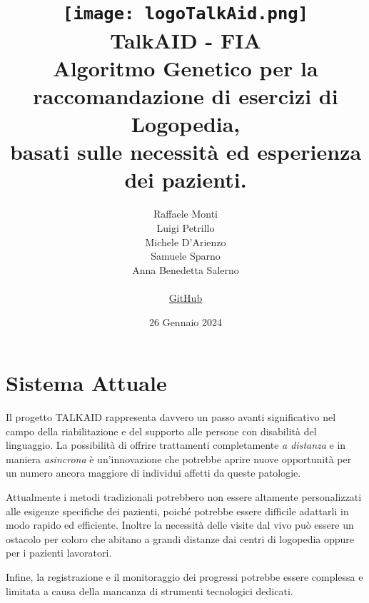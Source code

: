 \documentclass{article}
\begin{document}
    \title{
    \texttt{[image: logoTalkAid.png]} \\[1cm]
    \textbf{TalkAID - FIA}\\
    \vspace{0.5cm}
    \large Algoritmo Genetico per la raccomandazione di esercizi di Logopedia,\\
    basati sulle necessità ed esperienza dei pazienti.
}
    \author{
    Raffaele Monti\\
    Luigi Petrillo\\
    Michele D'Arienzo\\
     Samuele Sparno\\
    Anna Benedetta Salerno\\
    \vspace{0.5cm}
    \\
    \href{https://github.com/r-monti/fia}{GitHub}
}
    \date{26 Gennaio 2024}

    \maketitle

    \pagebreak

    \tableofcontents

    \pagebreak

    \section{Sistema Attuale}

    Il progetto TALKAID rappresenta davvero un passo avanti significativo nel campo della riabilitazione e del supporto alle persone con disabilità del linguaggio. La possibilità di offrire trattamenti completamente \textit{a distanza} e in maniera \textit{asincrona} è un'innovazione che potrebbe aprire nuove opportunità per un numero ancora maggiore di individui affetti da queste patologie.

   Attualmente i metodi tradizionali potrebbero non essere altamente personalizzati alle esigenze specifiche dei pazienti, poiché potrebbe essere difficile adattarli in modo rapido ed efficiente. Inoltre la necessità delle visite dal vivo può essere un ostacolo per coloro che abitano a grandi distanze dai centri di logopedia oppure per i pazienti lavoratori.

    Infine, la registrazione e il monitoraggio dei progressi potrebbe essere complessa e limitata a causa della mancanza di strumenti tecnologici dedicati.
\end{document}
